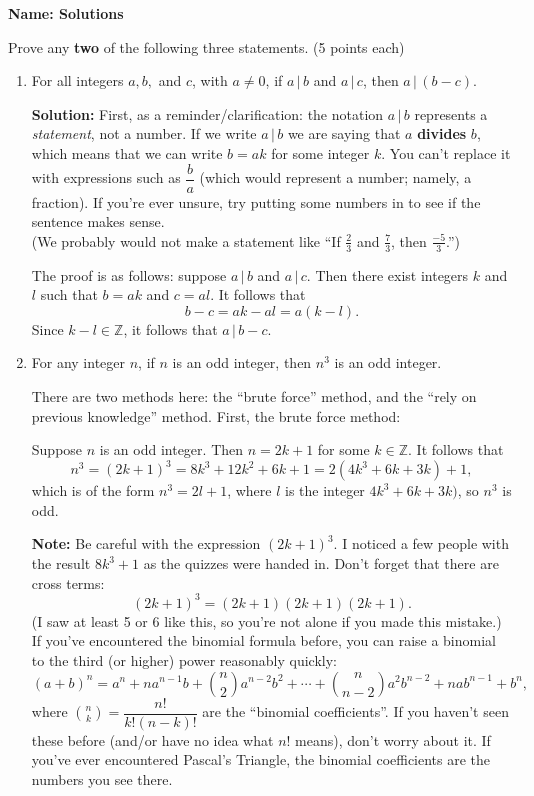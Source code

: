 \documentclass[12pt]{article}
\newcommand{\Z}{\mathbb{Z}}
\renewcommand{\div}[2]{#1\, |\,#2}
\begin{document}
{\bf Name: Solutions}
\thispagestyle{fancy}

\bigskip


Prove any {\bf two} of the following three statements. (5 points each)
\begin{enumerate}
 \item For all integers $a, b,$ and $c$, with $a\neq 0$, if $\div{a}{b}$ and $\div{a}{c}$, then $\div{a}{(b-c)}$.

\bigskip

{\bf Solution:} First, as a reminder/clarification: the notation $\div{a}{b}$ represents a {\em statement}, not a number. If we write $\div{a}{b}$ we are saying that $a$ {\bf divides} $b$, which means that we can write $b=ak$ for some integer $k$. You can't replace it with expressions such as $\dfrac{b}{a}$ (which would represent a number; namely, a fraction). If you're ever unsure, try putting some numbers in to see if the sentence makes sense. \\
(We probably would not make a statement like ``If $\frac{2}{3}$ and $\frac{7}{3}$, then $\frac{-5}{3}$.'')

The proof is as follows: suppose $\div{a}{b}$ and $\div{a}{c}$. Then there exist integers $k$ and $l$ such that $b=ak$ and $c=al$. It follows that
\[
 b-c = ak-al = a(k-l).
\]
Since $k-l\in\Z$, it follows that $\div{a}{b-c}$.


 \item For any integer $n$, if $n$ is an odd integer, then $n^3$ is an odd integer.

\bigskip

There are two methods here: the ``brute force'' method, and the ``rely on previous knowledge'' method. First, the brute force method:

Suppose $n$ is an odd integer. Then $n=2k+1$ for some $k\in \Z$. It follows that 
\[
 n^3 = (2k+1)^3 = 8k^3+12k^2+6k+1 = 2(4k^3+6k+3k)+1,
\]
which is of the form $n^3=2l+1$, where $l$ is the integer $4k^3+6k+3k)$, so $n^3$ is odd.

{\bf Note:} Be careful with the expression $(2k+1)^3$. I noticed a few people with the result $8k^3+1$ as the quizzes were handed in. Don't forget that there are cross terms:
\[
 (2k+1)^3 = (2k+1)(2k+1)(2k+1).
\]
(I saw at least 5 or 6 like this, so you're not alone if you made this mistake.) If you've encountered the binomial formula before, you can raise a binomial to the third (or higher) power reasonably quickly:
\[
 (a+b)^n = a^n + na^{n-1}b + \binom{n}{2} a^{n-2}b^2+\cdots + \binom{n}{n-2}a^2b^{n-2}+nab^{n-1}+b^n,
\]
where $\binom{n}{k} = \dfrac{n!}{k!(n-k)!}$ are the ``binomial coefficients''. If you haven't seen these before (and/or have no idea what $n!$ means), don't worry about it. If you've ever encountered Pascal's Triangle, the binomial coefficients are the numbers you see there.


\end{enumerate}
\end{document}
